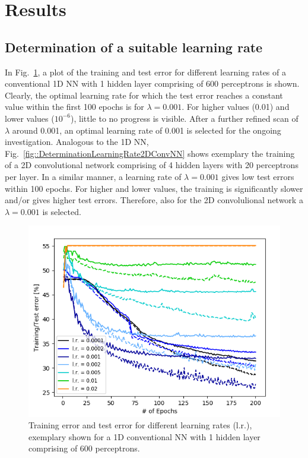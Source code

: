 \documentclass[a4paper, 12pt, conference]{article}
\begin{document}
\section{Results}
\subsection{Determination of a suitable learning rate}
In Fig.~\ref{fig::DeterminationLearningRate1DConvNN}, a plot of the training and test error for different learning rates of a conventional 1D NN with 1 hidden layer comprising of 600 perceptrons is shown. Clearly, the optimal learning rate for which the test error reaches a constant value within the first 100 epochs is for $\lambda = 0.001$. For higher values (0.01) and lower values ($10^{-6}$), little to no progress is visible. After a further refined scan of $\lambda$ around 0.001, an optimal learning rate of 0.001 is selected for the ongoing investigation. Analogous to the 1D NN, Fig.~\ref{fig::DeterminationLearningRate2DConvNN} shows exemplary the training of a 2D convolutional network comprising of 4 hidden layers with 20 perceptrons per layer. In a similar manner, a learning rate of $\lambda = 0.001$ gives low test errors within 100 epochs. For higher and lower values, the training is significantly slower and/or gives higher test errors. Therefore, also for the 2D convolulional network a $\lambda = 0.001$ is selected.\\
\begin{figure}[H]
	\centering
  \includegraphics[scale=0.5]{DetLearnRate2DConvNN20PerceptFinal.png}
  \caption{Training error and test error for different learning rates (l.r.), exemplary shown for a 1D conventional NN with 1 hidden layer comprising of 600 perceptrons.}
  \label{fig::DeterminationLearningRate1DConvNN}
\end{figure}
\end{document}
